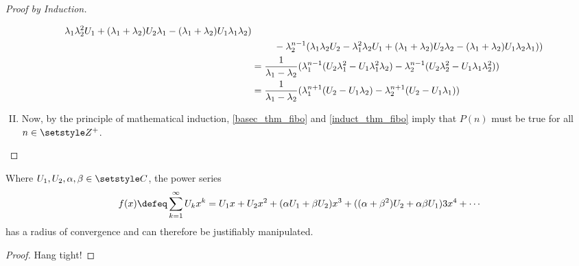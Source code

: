 \begin{proof}[Proof by Induction]
\begin{enumerate}[I.]
\begin{alignat*}
                        \lambda_1 \lambda_2^2 U_1 +
                        (\lambda_1 + \lambda_2) U_2 \lambda_1 -
                        (\lambda_1 + \lambda_2) U_1 \lambda_1 \lambda_2) \\
              &&{}-{}& \lambda_2^{n - 1}(
                        \lambda_1 \lambda_2 U_2 -
                        \lambda_1^2 \lambda_2 U_1 +
                        (\lambda_1 + \lambda_2) U_2 \lambda_2 -
                        (\lambda_1 + \lambda_2) U_1 \lambda_2 \lambda_1)
                      ) \\
                   &= \mathrlap{
                       \frac 1{\lambda_1 - \lambda_2}(
                        \lambda_1^{n - 1}(
                         U_2 \lambda_1^2 - U_1 \lambda_1^2 \lambda_2)
                      - \lambda_2^{n - 1}(
                         U_2 \lambda_2^2 - U_1 \lambda_1 \lambda_2^2)
                      )} \\
                   &= \mathrlap{
                       \frac 1{\lambda_1 - \lambda_2}(
                        \lambda_1^{n + 1}(
                         U_2 - U_1 \lambda_2)
                      - \lambda_2^{n + 1}(
                         U_2 - U_1 \lambda_1)
                      )}
        \end{alignat*}
  \item Now, by the principle of mathematical induction, \ref{basec_thm_fibo}
        and \ref{induct_thm_fibo} imply that \(P(n)\) must be true for all \(n
        \in \Integers^+\). \qedhere
 \end{enumerate}
\end{proof}
\begin{lemma}
\label{lem_fibo_convergence}
 Where \(U_1, U_2, \alpha, \beta \in \Complex\), the power series
 \begin{equation*}
  f(x) \defeq \sum_{k=1}^\infty U_k x^k
            = U_1 x + U_2 x^2 + (\alpha U_1 + \beta U_2) x^3
            + ((\alpha + \beta^2)U_2 + \alpha \beta U_1)3x^4 + \dotsb
 \end{equation*}
 has a radius of convergence and can therefore be justifiably manipulated.
\end{lemma}
\begin{proof}
 Hang tight!
\end{proof}
